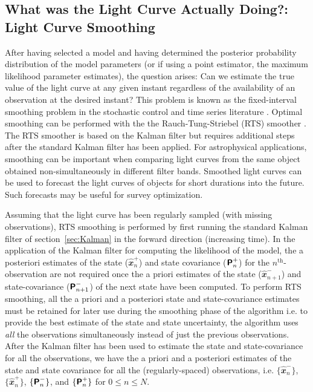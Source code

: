 \documentclass[a4paper,fleqn,usenatbib]{mnras}
\begin{document}
\subsection[Light Curve Smoothing]{What was the Light Curve Actually Doing?: Light Curve Smoothing}\label{sec:Smoothing}

After having selected a model and having determined the posterior probability distribution of the model parameters (or if using a point estimator, the maximum likelihood parameter estimates), the question arises: Can we estimate the true value of the light curve at any given instant regardless of the availability of an observation at the desired instant? This problem is known as the fixed-interval smoothing problem in the stochastic control and time series literature \citep{Simon,DurbinKoopman}. Optimal smoothing can be performed with the the Rauch-Tung-Striebel (RTS) smoother \citep*{RTS65}. The RTS smoother is based on the Kalman filter but requires additional steps after the standard Kalman filter has been applied. For astrophysical applications, smoothing can be important when comparing light curves from the same object obtained non-simultaneously in different filter bands. Smoothed light curves can be used to forecast the light curves of objects for short durations into the future. Such forecasts may be useful for survey optimization. 

Assuming that the light curve has been regularly sampled (with missing observations), RTS smoothing is performed by first running the standard Kalman filter of section~\ref{sec:Kalman} in the forward direction (increasing time). In the application of the Kalman filter for computing the likelihood of the model, the a posteriori estimates of the state ($\widehat{\mathbfit{x}}^{+}_{n}$) and state covariance ($\textbf{\textsf{P}}^{+}_{n}$) for the $n^{\mathrm{th}}$-observation are not required once the a priori estimates of the state ($\widehat{\mathbfit{x}}^{-}_{n+1}$) and state-covariance ($\textbf{\textsf{P}}^{-}_{n+1}$) of the next state have been computed. To perform RTS smoothing, all the a priori and a posteriori state and state-covariance estimates must be retained for later use during the smoothing phase of the algorithm i.e. to provide the best estimate of the state and state uncertainty, the algorithm uses \textit{all} the observations simultaneously instead of just the previous observations.
After the Kalman filter has been used to estimate the state and state-covariance for all the observations, we have the a priori and a posteriori estimates of the state and state covariance for all the (regularly-spaced) observations, i.e. $\{ \widehat{\mathbfit{x}}^{-}_{n} \}$, $\{ \widehat{\mathbfit{x}}^{+}_{n} \}$, $\{ \textbf{\textsf{P}}^{-}_{n} \}$, and $\{ \textbf{\textsf{P}}^{+}_{n} \}$ for $0 \leq n \leq N$. 
\end{document}
